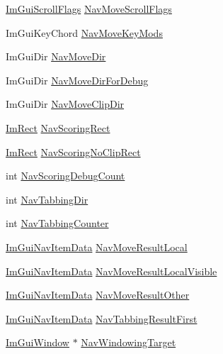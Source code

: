 \begin{DoxyCompactItemize}
\item 
\hyperlink{imgui__internal_8h_a3c23ec9366e4bede0fedb065a79dcbc1}{Im\+Gui\+Scroll\+Flags} \hyperlink{structImGuiContext_a5153d4b5c4ffcfb34cb3d1c45b3506bf}{Nav\+Move\+Scroll\+Flags}
\item 
Im\+Gui\+Key\+Chord \hyperlink{structImGuiContext_ad849198b8d97239808739aafe4754d2e}{Nav\+Move\+Key\+Mods}
\item 
Im\+Gui\+Dir \hyperlink{structImGuiContext_a20208736529ff4a1067d8d15ef17400b}{Nav\+Move\+Dir}
\item 
Im\+Gui\+Dir \hyperlink{structImGuiContext_a955774256450d53d8466e28495741ac8}{Nav\+Move\+Dir\+For\+Debug}
\item 
Im\+Gui\+Dir \hyperlink{structImGuiContext_a445c588479dbf5122c062ba8bcdb99e2}{Nav\+Move\+Clip\+Dir}
\item 
\hyperlink{structImRect}{Im\+Rect} \hyperlink{structImGuiContext_a39fb4271af9f1e60e3e5d4c3707e2773}{Nav\+Scoring\+Rect}
\item 
\hyperlink{structImRect}{Im\+Rect} \hyperlink{structImGuiContext_adfc19aa2d5bf8c7e7bb8944946cfd6ba}{Nav\+Scoring\+No\+Clip\+Rect}
\item 
int \hyperlink{structImGuiContext_aad0534754076c6f8d877bd19c5760a6a}{Nav\+Scoring\+Debug\+Count}
\item 
int \hyperlink{structImGuiContext_acb60e5e6a41146db87fea98a4c3332f2}{Nav\+Tabbing\+Dir}
\item 
int \hyperlink{structImGuiContext_af1fa9ff1a1315592ff9ddf1802579411}{Nav\+Tabbing\+Counter}
\item 
\hyperlink{structImGuiNavItemData}{Im\+Gui\+Nav\+Item\+Data} \hyperlink{structImGuiContext_a59df70904cc425fd2bba56b20655bb9b}{Nav\+Move\+Result\+Local}
\item 
\hyperlink{structImGuiNavItemData}{Im\+Gui\+Nav\+Item\+Data} \hyperlink{structImGuiContext_ae408e3ce0610927e94f065aeb32869ac}{Nav\+Move\+Result\+Local\+Visible}
\item 
\hyperlink{structImGuiNavItemData}{Im\+Gui\+Nav\+Item\+Data} \hyperlink{structImGuiContext_a68660b4bf8e33143cd8b490dc8bb2ebb}{Nav\+Move\+Result\+Other}
\item 
\hyperlink{structImGuiNavItemData}{Im\+Gui\+Nav\+Item\+Data} \hyperlink{structImGuiContext_a7eb64dfe2b4ae995bbbe8afbd53c8fce}{Nav\+Tabbing\+Result\+First}
\item 
\hyperlink{structImGuiWindow}{Im\+Gui\+Window} $\ast$ \hyperlink{structImGuiContext_a90cb834d237027d39e0d2efbe3d90d04}{Nav\+Windowing\+Target}
\item 

\end{DoxyCompactItemize}
